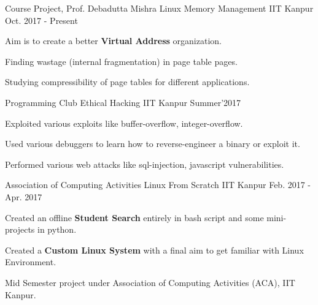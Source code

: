

\begin{cventries}

  \cventry
    {Course Project, Prof. Debadutta Mishra} %
    {Linux Memory Management} %
    {IIT Kanpur} %
    {Oct. 2017 - Present} %
    {
      \begin{cvitems} %
        \item {Aim is to create a better \textbf{Virtual Address} organization.}
        \item {Finding wastage (internal fragmentation) in page table pages.} 
        \item {Studying compressibility of page tables for different applications.}
      \end{cvitems}
    }



  \cventry
    {Programming Club} %
    {Ethical Hacking} %
    {IIT Kanpur} %
    {Summer'2017} %
    {
      \begin{cvitems} %
        \item {Exploited various exploits like buffer-overflow, integer-overflow.}
        \item {Used various debuggers to learn how to reverse-engineer a binary or exploit it.}
        \item {Performed various web attacks like sql-injection, javascript vulnerabilities.}
      \end{cvitems}
    }



  \cventry
    {Association of Computing Activities} %
    {Linux From Scratch} %
    {IIT Kanpur} %
    {Feb. 2017 - Apr. 2017} %
    {
      \begin{cvitems} %
        \item {Created an offline \textbf{Student Search} entirely in bash script and some mini-projects in python.}
        \item {Created a \textbf{Custom Linux System} with a final aim to get familiar with Linux Environment.}
        \item {Mid Semester project under Association of Computing Activities (ACA), IIT Kanpur.}
      \end{cvitems}
    }

\end{cventries}

